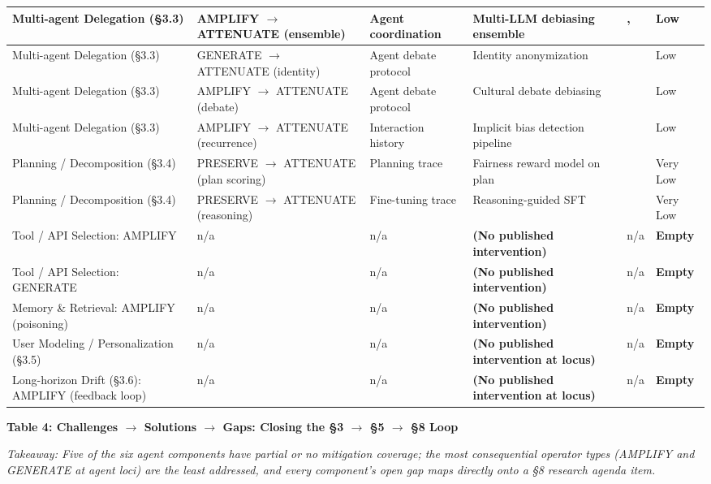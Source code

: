 \documentclass[10pt]{article}
\begin{document}
\begin{center}
\begin{longtable}{|p{}|p{}|p{}|p{}|p{}|p{}|}
Multi-agent Delegation (\S{}3.3) & AMPLIFY $\rightarrow$ ATTENUATE (ensemble) & Agent coordination & Multi-LLM debiasing ensemble & \cite{owens2024multi}, \cite{xu2024mitigating} & Low \\ \hline
Multi-agent Delegation (\S{}3.3) & GENERATE $\rightarrow$ ATTENUATE (identity) & Agent debate protocol & Identity anonymization & \cite{choi2025identity} & Low \\ \hline
Multi-agent Delegation (\S{}3.3) & AMPLIFY $\rightarrow$ ATTENUATE (debate) & Agent debate protocol & Cultural debate debiasing & \cite{ki2025multiple} & Low \\ \hline
Multi-agent Delegation (\S{}3.3) & AMPLIFY $\rightarrow$ ATTENUATE (recurrence) & Interaction history & Implicit bias detection pipeline & \cite{borah2024implicit} & Low \\ \hline
Planning / Decomposition (\S{}3.4) & PRESERVE $\rightarrow$ ATTENUATE (plan scoring) & Planning trace & Fairness reward model on plan & \cite{hall2025guiding} & Very Low \\ \hline
Planning / Decomposition (\S{}3.4) & PRESERVE $\rightarrow$ ATTENUATE (reasoning) & Fine-tuning trace & Reasoning-guided SFT & \cite{kabra2025reasoning} & Very Low \\ \hline
Tool / API Selection: AMPLIFY & n/a & n/a & \textbf{(No published intervention)} & n/a & \textbf{Empty} \\ \hline
Tool / API Selection: GENERATE & n/a & n/a & \textbf{(No published intervention)} & n/a & \textbf{Empty} \\ \hline
Memory \& Retrieval: AMPLIFY (poisoning) & n/a & n/a & \textbf{(No published intervention)} & n/a & \textbf{Empty} \\ \hline
User Modeling / Personalization (\S{}3.5) & n/a & n/a & \textbf{(No published intervention at locus)} & n/a & \textbf{Empty} \\ \hline
Long-horizon Drift (\S{}3.6): AMPLIFY (feedback loop) & n/a & n/a & \textbf{(No published intervention at locus)} & n/a & \textbf{Empty} \\ \hline
\end{longtable}\end{center}


\textbf{Table 4: Challenges $\rightarrow$ Solutions $\rightarrow$ Gaps: Closing the \S{}3 $\rightarrow$ \S{}5 $\rightarrow$ \S{}8 Loop}

\emph{Takeaway: Five of the six agent components have partial or no mitigation coverage; the most consequential operator types (AMPLIFY and GENERATE at agent loci) are the least addressed, and every component's open gap maps directly onto a \S{}8 research agenda item.}
\end{document}
